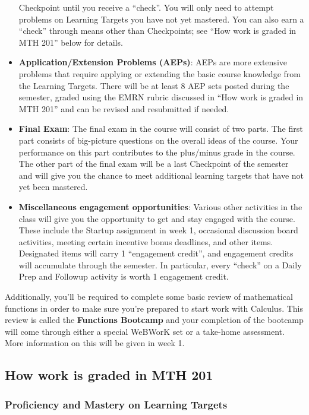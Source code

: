 \documentclass[]{article}
\begin{document}
\begin{itemize}
  Checkpoint until you receive a ``check''. You will only need to
  attempt problems on Learning Targets you have not yet mastered. You
  can also earn a ``check'' through means other than Checkpoints; see
  ``How work is graded in MTH 201'' below for details.
\item
  \textbf{Application/Extension Problems (AEPs)}: AEPs are more
  extensive problems that require applying or extending the basic course
  knowledge from the Learning Targets. There will be at least 8 AEP sets
  posted during the semester, graded using the EMRN rubric discussed in
  ``How work is graded in MTH 201'' and can be revised and resubmitted
  if needed.
\item
  \textbf{Final Exam}: The final exam in the course will consist of two
  parts. The first part consists of big-picture questions on the overall
  ideas of the course. Your performance on this part contributes to the
  plus/minus grade in the course. The other part of the final exam will
  be a last Checkpoint of the semester and will give you the chance to
  meet additional learning targets that have not yet been mastered.
\item
  \textbf{Miscellaneous engagement opportunities}: Various other
  activities in the class will give you the opportunity to get and stay
  engaged with the course. These include the Startup assignment in week
  1, occasional discussion board activities, meeting certain incentive
  bonus deadlines, and other items. Designated items will carry 1
  ``engagement credit'', and engagement credits will accumulate through
  the semester. In particular, every ``check'' on a Daily Prep and
  Followup activity is worth 1 engagement credit.
\end{itemize}

Additionally, you'll be required to complete some basic review of
mathematical functions in order to make sure you're prepared to start
work with Calculus. This review is called the \textbf{Functions
Bootcamp} and your completion of the bootcamp will come through either a
special WeBWorK set or a take-home assessment. More information on this
will be given in week 1.

\hypertarget{how-work-is-graded-in-mth-201}{%
\subsection{How work is graded in MTH
201}\label{how-work-is-graded-in-mth-201}}

\hypertarget{proficiency-and-mastery-on-learning-targets}{%
\subsubsection{Proficiency and Mastery on Learning
Targets}\label{proficiency-and-mastery-on-learning-targets}}
\end{document}
